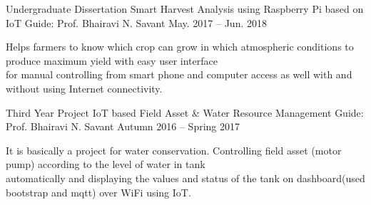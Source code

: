 

\begin{cventries}


\cventry
{Undergraduate Dissertation} %
{Smart Harvest Analysis using Raspberry Pi based on IoT} %
{Guide: Prof. Bhairavi N. Savant} %
{May. 2017 – Jun. 2018} %
{ %
	\begin{cvitems}
		\item {Helps farmers to know which crop can grow in which atmospheric conditions to produce maximum yield with easy user
interface\\ for manual controlling from smart phone and computer access as well with and without using Internet connectivity.}
	\end{cvitems}
}

\vspace{-10pt}


\cventry
{Third Year Project} %
{IoT based Field Asset \& Water Resource Management} %
{Guide: Prof. Bhairavi N. Savant} %
{Autumn 2016 – Spring 2017} %
{ %
\begin{cvitems}
\item {It is basically a project for water conservation. Controlling field asset (motor pump) according to the level of water in tank\\
automatically and displaying the values and status of the tank on dashboard(used bootstrap and mqtt) over WiFi using IoT.}
\end{cvitems}
}


\end{cventries}